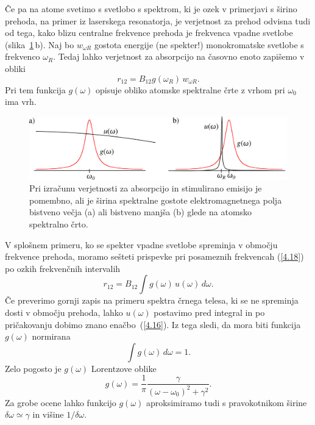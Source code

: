 Če pa na atome svetimo s svetlobo s spektrom, ki je ozek v primerjavi s širino prehoda, na
primer iz laserskega resonatorja, je verjetnost za prehod odvisna tudi od tega, kako
blizu centralne frekvence prehoda je frekvenca vpadne svetlobe (slika~\ref{fig:spektri}\,b). 
Naj bo $w_{\omega R}$ gostota energije (ne spekter!) monokromatske svetlobe s frekvenco
$\omega_R$. Tedaj lahko verjetnost za absorpcijo na časovno enoto zapišemo
v obliki 
\begin{equation}
r_{12}=B_{12}g(\omega_R)\, w_{\omega R}.
\label{4.18}
\end{equation}
Pri tem funkcija $g(\omega)$ opisuje obliko atomske spektralne črte z vrhom 
pri $\omega_{0}$ ima vrh. \\
\begin{figure}[h]
\centering
\includegraphics[width=12truecm]{slike/05_Spektri.png}
\caption{Pri izračunu verjetnosti za absorpcijo in stimulirano emisijo je pomembno, ali je 
širina spektralne gostote elektromagnetnega polja bistveno večja (a) ali bistveno manjša (b)
glede na atomsko spektralno črto.}
\label{fig:spektri}
\end{figure}


V splošnem primeru, ko se spekter vpadne svetlobe spreminja v območju 
frekvence prehoda, moramo sešteti prispevke pri posameznih frekvencah (\ref{4.18}) 
po ozkih frekvenčnih intervalih
\begin{equation}
r_{12}=B_{12}\int g(\omega)\, u(\omega)\, d\omega.
\label{4.19}
\end{equation}
Če preverimo gornji zapis na primeru spektra črnega telesa, ki se ne spreminja 
dosti v območju prehoda, lahko $u(\omega)$ postavimo pred integral in po pričakovanju
dobimo znano enačbo~(\ref{4.16}). Iz tega sledi, da mora biti funkcija $g(\omega)$ normirana
\begin{equation}
\int g(\omega)\, d\omega=1.
\label{4.20}
\end{equation}
Zelo pogosto je $g(\omega)$ Lorentzove oblike
\begin{equation}
g(\omega)=\frac{1}{\pi}\frac{\gamma}{(\omega-\omega_{0})^{2}+\gamma^{2}}.
\label{4.21}
\end{equation}
Za grobe ocene lahko funkcijo $g(\omega)$ aproksimiramo tudi s pravokotnikom širine
$\delta\omega\simeq\gamma$ in višine $1/\delta\omega$.

